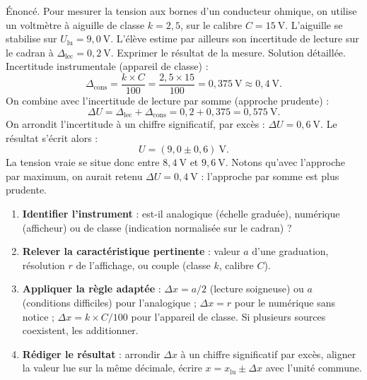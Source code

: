 \documentclass[11pt]{article}
\begin{document}
\begin{exoresolu}
Énoncé. Pour mesurer la tension aux bornes d'un conducteur ohmique, on utilise un voltmètre à aiguille de classe $k = 2{,}5$, sur le calibre $C = 15\ \text{V}$. L'aiguille se stabilise sur $U_{\text{lu}} = 9{,}0\ \text{V}$. L'élève estime par ailleurs son incertitude de lecture sur le cadran à $\Delta_{\text{lec}} = 0{,}2\ \text{V}$. Exprimer le résultat de la mesure.
\tcblower
Solution détaillée. Incertitude instrumentale (appareil de classe) :
\[ \Delta_{\text{cons}} = \frac{k \times C}{100} = \frac{2{,}5 \times 15}{100} = 0{,}375\ \text{V} \approx 0{,}4\ \text{V}. \]
On combine avec l'incertitude de lecture par somme (approche prudente) :
\[ \Delta U = \Delta_{\text{lec}} + \Delta_{\text{cons}} = 0{,}2 + 0{,}375 = 0{,}575\ \text{V}. \]
On arrondit l'incertitude à un chiffre significatif, par excès : $\Delta U = 0{,}6\ \text{V}$. Le résultat s'écrit alors :
\[ \boxed{U = (9{,}0 \pm 0{,}6)\ \text{V}}. \]
La tension vraie se situe donc entre $8{,}4\ \text{V}$ et $9{,}6\ \text{V}$. Notons qu'avec l'approche par maximum, on aurait retenu $\Delta U = 0{,}4\ \text{V}$ : l'approche par somme est plus prudente.
\end{exoresolu}

\begin{methode}
\begin{enumerate}
\item \textbf{Identifier l'instrument} : est-il analogique (échelle graduée), numérique (afficheur) ou de classe (indication normalisée sur le cadran) ?
\item \textbf{Relever la caractéristique pertinente} : valeur $a$ d'une graduation, résolution $r$ de l'affichage, ou couple (classe $k$, calibre $C$).
\item \textbf{Appliquer la règle adaptée} : $\Delta x = a/2$ (lecture soigneuse) ou $a$ (conditions difficiles) pour l'analogique ; $\Delta x = r$ pour le numérique sans notice ; $\Delta x = k \times C / 100$ pour l'appareil de classe. Si plusieurs sources coexistent, les additionner.
\item \textbf{Rédiger le résultat} : arrondir $\Delta x$ à un chiffre significatif par excès, aligner la valeur lue sur la même décimale, écrire $x = x_{\text{lu}} \pm \Delta x$ avec l'unité commune.
\end{enumerate}
\end{methode}
\end{document}

